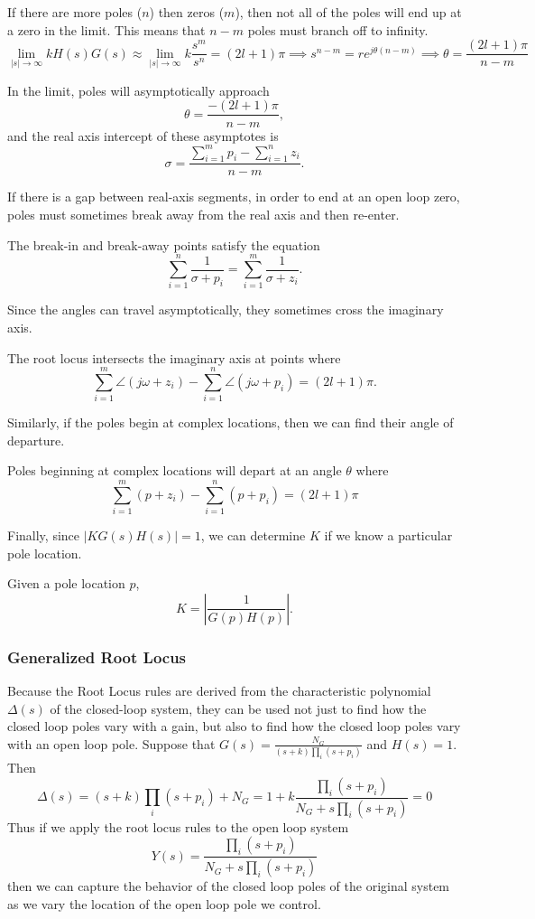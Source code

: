 If there are more poles ($n$) then zeros ($m$), then not all of the poles will end up at a zero in the limit. This means that $n-m$ poles must branch off to infinity.
\[
  \lim_{|s|\to\infty} kH(s)G(s) \approx \lim_{|s|\to\infty}k\frac{s^m}{s^n} = (2l+1)\pi \implies s^{n-m} = re^{j\theta(n-m)} \implies \theta = \frac{(2l+1)\pi}{n-m}
\]
\begin{theorem}
  In the limit, poles will asymptotically approach
  \[
	\theta = \frac{-(2l+1)\pi}{n-m},
  \]
  and the real axis intercept of these asymptotes is
  \[
	\sigma = \frac{\sum_{i=1}^m p_i - \sum_{i=1}^n z_i}{n-m}.
  \]
  \label{thm:rl-five}
\end{theorem}
If there is a gap between real-axis segments, in order to end at an open loop zero, poles must sometimes break away from the real axis and then re-enter.
\begin{theorem}
  The break-in and break-away points satisfy the equation
  \[
	\sum_{i=1}^n \frac{1}{\sigma + p_i} = \sum_{i=1}^m \frac{1}{\sigma+z_i}.
  \]
  \label{thm:rl-six}
\end{theorem}
Since the angles can travel asymptotically, they sometimes cross the imaginary axis.
\begin{theorem}
  The root locus intersects the imaginary axis at points where \[
	\sum_{i=1}^m \angle (j\omega + z_i) - \sum_{i=1}^n \angle (j\omega + p_i) = (2l+1)\pi.
  \]
  \label{thm:rl-seven}
\end{theorem}
Similarly, if the poles begin at complex locations, then we can find their angle of departure.
\begin{theorem}
  Poles beginning at complex locations will depart at an angle $\theta$ where \[
	\sum_{i=1}^m (p + z_i) - \sum_{i=1}^n (p + p_i) = (2l+1)\pi
  \]

  \label{thm:rl-eight}
\end{theorem}
Finally, since $|KG(s)H(s)|=1$, we can determine $K$ if we know a particular pole location.
\begin{theorem}
  Given a pole location $p$,
  \[
	K = \left|\frac{1}{G(p)H(p)}\right|.
  \]
  \label{thm:rl-nine}
\end{theorem}
\subsubsection{Generalized Root Locus}
Because the Root Locus rules are derived from the characteristic polynomial $\Delta(s)$ of the closed-loop system, they can be used not just to find how the closed loop poles vary with a gain, but also to find how the closed loop poles vary with an open loop pole.
Suppose that $G(s) = \frac{N_G}{(s+k)\prod_i(s+p_i)}$ and $H(s) = 1$. Then
\[
  \Delta(s) = (s+k)\prod_i(s+p_i) + N_G = 1 + k\frac{\prod_i (s+p_i) }{N_G + s\prod_i(s+p_i)} = 0
\]
Thus if we apply the root locus rules to the open loop system
\[
  Y(s) = \frac{\prod_i (s+p_i) }{N_G + s\prod_i(s+p_i)}
\]
then we can capture the behavior of the closed loop poles of the original system as we vary the location of the open loop pole we control.
